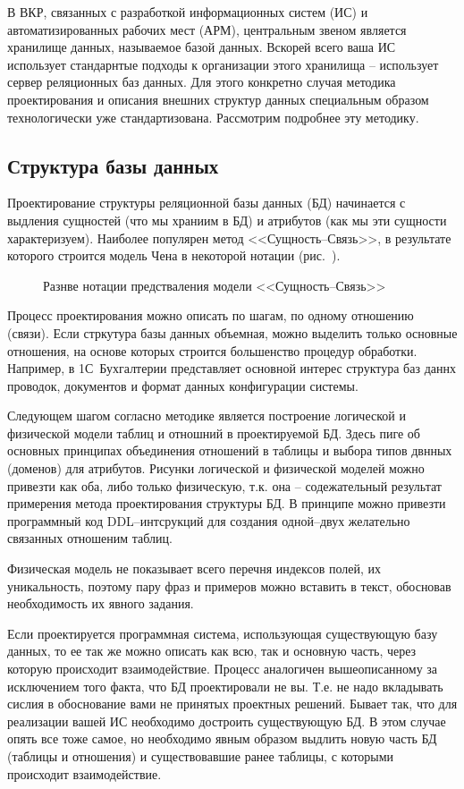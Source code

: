 \documentclass[a4paper,14pt,final]{extreport}
\begin{document}
В ВКР, связанных с разработкой информационных систем (ИС) и автоматизированных рабочих мест (АРМ), центральным звеном является хранилище данных, называемое базой данных.  Вскорей всего ваша ИС использует стандарнтые подходы к организации этого хранилища -- использует сервер реляционных баз данных.  Для этого конкретно случая методика проектирования и описания внешних структур данных специальным образом технологически уже стандартизована.  Рассмотрим подробнее эту методику.

\subsection{Структура базы данных}
\label{sec:databasestruct}

Проектирование структуры реляционной базы данных (БД) начинается с выдления сущностей (что мы храниим в БД) и атрибутов (как мы эти сущности характеризуем).  Наиболее популярен метод <<Сущность--Связь>>, в результате которого строится модель Чена в некоторой нотации (рис.~).
\begin{figure}[hbt]
  \centering

  \caption[Нотации для модели Чена]{Разнве нотации предстваления модели <<Сущность--Связь>>}
  \label{fig:changmodels}
\end{figure}
Процесс проектирования можно описать по шагам, по одному отношению (связи).  Если стркутура базы данных объемная, можно выделить только основные отношения, на основе которых строится большенство процедур обработки.  Например, в 1С~Бухгалтерии представляет основной интерес структура баз даннх проводок, документов и формат данных конфигурации системы.

Следующем шагом согласно методике является построение логической и физической модели таблиц и отношний в проектируемой БД.  Здесь пиге об основных принципах объединения отношений в таблицы и выбора типов двнных (доменов) для атрибутов.  Рисунки логической и физической моделей можно привезти как оба, либо только физическую, т.к. она -- содежательный результат примерения метода проектирования структуры БД.  В принципе можно привезти программный код DDL--интсрукций для создания одной--двух желательно связанных отношеним таблиц.

Физическая модель не показывает всего перечня индексов полей, их уникальность, поэтому пару фраз и примеров можно вставить в текст, обосновав необходимость их явного задания.

Если проектируется программная система, использующая существующую базу данных, то ее так же можно описать как всю, так и основную часть, через которую происходит взаимодействие.  Процесс аналогичен вышеописанному за исключением того факта, что БД проектировали не вы. Т.е. не надо вкладывать сислия в обоснование вами не принятых проектных решений.  Бывает так, что для реализации вашей ИС необходимо достроить существующую БД.  В этом случае опять все тоже самое, но необходимо явным образом выдлить новую часть БД (таблицы и отношения) и существовавшие ранее таблицы, с которыми происходит взаимодействие.
\end{document}
